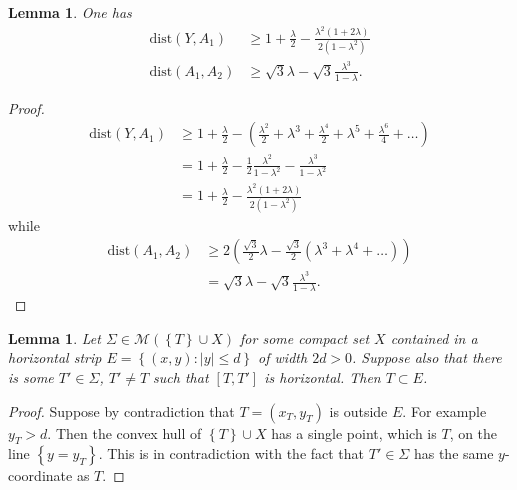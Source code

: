 \documentclass{article}
\newcommand{\abs}[1]{\left\vert #1 \right\vert}
\newcommand{\enclose}[1]{\left(#1\right)}
\newcommand{\ENCLOSE}[1]{\left\{#1\right\}}
\newcommand{\M}{\mathcal{M}}
\newcommand{\dist}{\mathrm{dist}}
\newtheorem{lemma}[theorem]{Lemma}
\theoremstyle{definition}
\theoremstyle{remark}
\begin{document}
\begin{lemma}\label{lm:precedente1}
One has
\begin{align*}
    \dist(Y,A_1) & \ge 
    1+ \frac{\lambda} 2 
    - \frac{\lambda^2(1+2\lambda)}{2(1-\lambda^2)}\\
    \dist(A_1,A_2) & 
    \ge 
    \sqrt 3 \lambda - \sqrt 3 \frac{\lambda^3}{1-\lambda}.
\end{align*}
\end{lemma}
\begin{proof}
  \begin{align*}
  \dist(Y,A_1) &\ge 1+ \frac \lambda 2 
     - \enclose{\frac{\lambda^2}{2} 
      + \lambda^3 
      + \frac{\lambda^4 }{2}
      + \lambda^5
      + \frac{\lambda^6}{4} + \dots}\\
      &= 1 + \frac \lambda 2 
      - \frac{1}{2}\frac{\lambda^2}{1-\lambda^2}
      - \frac{\lambda^3}{1-\lambda^2}\\
      &= 1+ \frac{\lambda} 2 
      - \frac{\lambda^2(1+2\lambda)}{2(1-\lambda^2)}
  \end{align*}
  while 
  \begin{align*}
    \dist(A_1,A_2)
    &\ge 2\enclose{\frac{\sqrt 3}{2} \lambda 
      -\frac{\sqrt 3}{2}\enclose{\lambda^3 + \lambda^4 + \dots}
     }\\
    &= \sqrt 3 \lambda -\sqrt 3 \frac{\lambda^3}{1-\lambda}.
  \end{align*}
\end{proof}

\begin{lemma}\label{lm:envelope}
Let $\Sigma\in \M(\ENCLOSE{T}\cup X)$
for some compact set $X$ contained in a horizontal strip 
$E=\ENCLOSE{(x,y)\colon \abs{y}\le d}$ of width $2d>0$.
Suppose also that there is some $T'\in \Sigma$, $T'\neq T$ 
such that $[T,T']$ is horizontal.
Then $T\subset E$.
\end{lemma}
%
\begin{proof}
  Suppose by contradiction that $T=(x_T,y_T)$ is outside $E$.
  For example $y_T>d$. 
  Then the convex hull of $\ENCLOSE{T}\cup X$ has a single 
  point, which is $T$, on the line $\ENCLOSE{y=y_T}$. 
  This is in contradiction with the fact that $T'\in \Sigma$ 
  has the same $y$-coordinate as $T$.
\end{proof}
\end{document}
